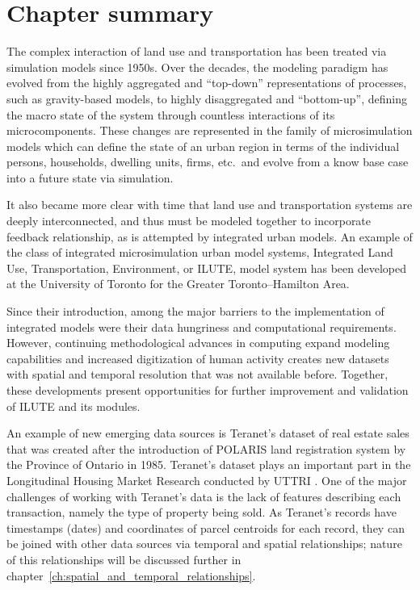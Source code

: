\section{Chapter summary} \label{sec:background_summary}

The complex interaction of land use and transportation has been treated via simulation models since 1950s.
Over the decades, the modeling paradigm has evolved from the highly aggregated and ``top-down'' representations of processes, such as gravity-based models, to highly disaggregated and ``bottom-up'', defining the macro state of the system through countless interactions of its microcomponents.
These changes are represented in the family of microsimulation models which can define the state of an urban region in terms of the individual persons, households, dwelling units, firms, etc.\ and evolve from a know base case into a future state via simulation.

It also became more clear with time that land use and transportation systems are deeply interconnected, and thus must be modeled together to incorporate feedback relationship, as is attempted by integrated urban models.
An example of the class of integrated microsimulation urban model systems, Integrated Land Use, Transportation, Environment, or ILUTE, model system has been developed at the University of Toronto for the Greater Toronto--Hamilton Area.

Since their introduction, among the major barriers to the implementation of integrated models were their data hungriness and computational requirements.
However, continuing methodological advances in computing expand modeling capabilities and increased digitization of human activity creates new datasets with spatial and temporal resolution that was not available before.
Together, these developments present opportunities for further improvement and validation of ILUTE and its modules.

An example of new emerging data sources is Teranet's dataset of real estate sales that was created after the introduction of POLARIS land registration system by the Province of Ontario in 1985.
Teranet's dataset plays an important part in the Longitudinal Housing Market Research conducted by UTTRI .
One of the major challenges of working with Teranet's data is the lack of features describing each transaction, namely the type of property being sold.
As Teranet's records have timestamps (dates) and coordinates of parcel centroids for each record, they can be joined with other data sources via temporal and spatial relationships;
nature of this relationships will be discussed further in chapter~\ref{ch:spatial_and_temporal_relationships}.
